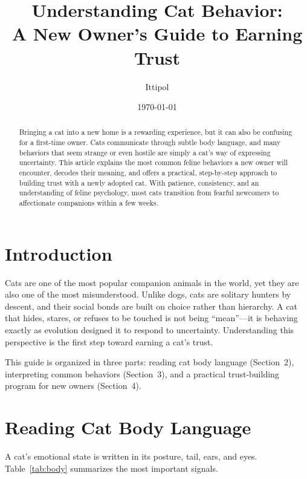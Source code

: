 \documentclass[12pt,a4paper]{article}
\title{Understanding Cat Behavior:\\A New Owner's Guide to Earning Trust}
\author{Ittipol}
\date{\today}
\begin{document}
\maketitle

\begin{abstract}
Bringing a cat into a new home is a rewarding experience, but it can also be confusing
for a first-time owner. Cats communicate through subtle body language, and many behaviors
that seem strange or even hostile are simply a cat's way of expressing uncertainty.
This article explains the most common feline behaviors a new owner will encounter,
decodes their meaning, and offers a practical, step-by-step approach to building trust
with a newly adopted cat. With patience, consistency, and an understanding of feline
psychology, most cats transition from fearful newcomers to affectionate companions
within a few weeks.
\end{abstract}

\tableofcontents
\newpage

\section{Introduction}
Cats are one of the most popular companion animals in the world, yet they are also one
of the most misunderstood. Unlike dogs, cats are solitary hunters by descent, and their
social bonds are built on choice rather than hierarchy. A cat that hides, stares, or
refuses to be touched is not being ``mean''---it is behaving exactly as evolution
designed it to respond to uncertainty. Understanding this perspective is the first step
toward earning a cat's trust.

This guide is organized in three parts: reading cat body language (Section~2),
interpreting common behaviors (Section~3), and a practical trust-building program
for new owners (Section~4).

\section{Reading Cat Body Language}
A cat's emotional state is written in its posture, tail, ears, and eyes. Table~\ref{tab:body}
summarizes the most important signals.
\end{document}
